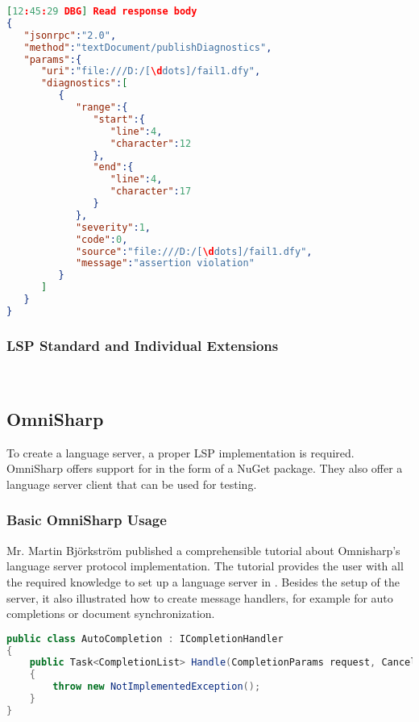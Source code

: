 \begin{lstlisting}[language=json, caption={LSP Message Example}, captionpos=b, label={lst:lspjsonmsg}]
[12:45:29 DBG] Read response body
{
   "jsonrpc":"2.0",
   "method":"textDocument/publishDiagnostics",
   "params":{
      "uri":"file:///D:/[\ddots]/fail1.dfy",
      "diagnostics":[
         {
            "range":{
               "start":{
                  "line":4,
                  "character":12
               },
               "end":{
                  "line":4,
                  "character":17
               }
            },
            "severity":1,
            "code":0,
            "source":"file:///D:/[\ddots]/fail1.dfy",
            "message":"assertion violation"
         }
      ]
   }
}
\end{lstlisting}

\subsubsection{LSP Standard and Individual Extensions}
\\

\subsection{OmniSharp}
\label{section:analysis:omnisharp}
To create a language server, a proper LSP implementation is required.
OmniSharp offers support for \Csharp \cite{langserverdotorg} in the form of a NuGet package.
They also offer a language server client that can be used for testing.

\subsubsection{Basic OmniSharp Usage}
Mr. Martin Bj\"orkstr\"om published a comprehensible tutorial about Omnisharp's language server protocol implementation.
The tutorial provides the user with all the required knowledge to set up a language server in \Csharp.
Besides the setup of the server, it also illustrated how to create message handlers, for example for auto completions or document synchronization.

\begin{lstlisting}[language=csharp, caption={LSP Handler Implementation}, captionpos=b, label={lst:lspbasichandler}]
public class AutoCompletion : ICompletionHandler
{
    public Task<CompletionList> Handle(CompletionParams request, CancellationToken cancellationToken)
    {
        throw new NotImplementedException();
    }
}
\end{lstlisting}

